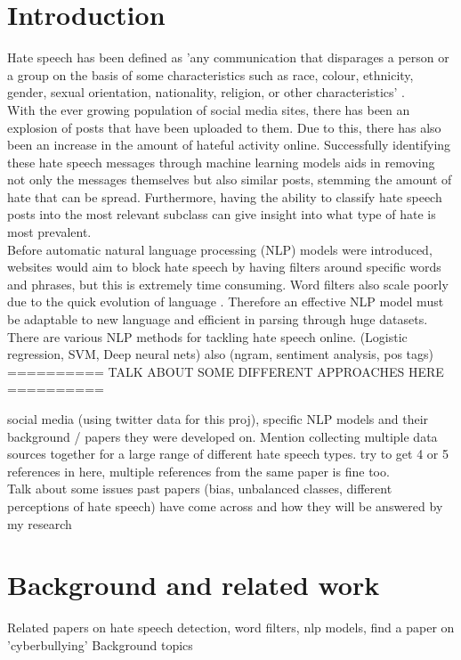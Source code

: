 \documentclass[conference]{IEEEtran}
\begin{document}
\section{Introduction}
Hate speech has been defined as 'any communication that disparages a person or a group on the basis of some characteristics such as race, colour, ethnicity, gender, sexual orientation, nationality, religion, or other characteristics' \cite{b1}. \\
With the ever growing population of social media sites, there has been an explosion of posts that have been uploaded to them. Due to this, there has also been an increase in the amount of hateful activity online. Successfully identifying these hate speech messages through machine learning models aids in removing not only the messages themselves but also similar posts, stemming the amount of hate that can be spread. Furthermore, having the ability to classify hate speech posts into the most relevant subclass can give insight into what type of hate is most prevalent.\\
Before automatic natural language processing (NLP) models were introduced, websites would aim to block hate speech by having filters around specific words and phrases, but this is extremely time consuming. Word filters also scale poorly due to the quick evolution of language \cite{b2, b3}. Therefore an effective NLP model must be adaptable to new language and efficient in parsing through huge datasets. \\
There are various NLP methods for tackling hate speech online. (Logistic regression, SVM, Deep neural nets) also (ngram, sentiment analysis, pos tags) ========== TALK ABOUT SOME DIFFERENT APPROACHES HERE ==========

\pagebreak
social media (using twitter data for this proj), specific NLP models and their background / papers they were developed on. Mention collecting multiple data sources together for a large range of different hate speech types. try to get 4 or 5 references in here, multiple references from the same paper is fine too.\\ Talk about some issues past papers (bias, unbalanced classes, different perceptions of hate speech) have come across and how they will be answered by my research

\section{Background and related work}
Related papers on hate speech detection, word filters, nlp models, find a paper on 'cyberbullying'
Background topics
\end{document}
